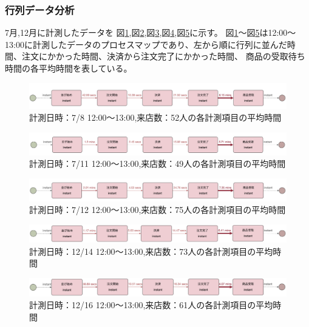 \documentclass{jsarticle}
\begin{document}
\subsubsection{行列データ分析}
7月,12月に計測したデータを
図\ref{fig:708},図\ref{fig:711},図\ref{fig:712},図\ref{fig:1214},図\ref{fig:1216}に示す。
図\ref{fig:708}〜図\ref{fig:1216}は12:00〜13:00に計測したデータのプロセスマップであり、左から順に行列に並んだ時間、注文にかかった時間、決済から注文完了にかかった時間、
商品の受取待ち時間の各平均時間を表している。

\begin{figure}[H]
  \centering
  \includegraphics[width=15cm]{708.png}
  \caption{計測日時：7/8 12:00〜13:00,来店数：52人の各計測項目の平均時間}
  \label{fig:708}
\end{figure}

\begin{figure}[H]
  \centering
  \includegraphics[width=15cm]{711.png}
  \caption{計測日時：7/11 12:00〜13:00,来店数：49人の各計測項目の平均時間}
  \label{fig:711}
\end{figure}

\begin{figure}[H]
  \centering
  \includegraphics[width=15cm]{712.png}
  \caption{計測日時：7/12 12:00〜13:00,来店数：75人の各計測項目の平均時間}
  \label{fig:712}
\end{figure}

\begin{figure}[H]
  \centering
  \includegraphics[width=15cm]{1214.png}
  \caption{計測日時：12/14 12:00〜13:00,来店数：73人の各計測項目の平均時間}
  \label{fig:1214}
\end{figure}

\begin{figure}[H]
  \centering
  \includegraphics[width=15cm]{1216.png}
  \caption{計測日時：12/16 12:00〜13:00,来店数：61人の各計測項目の平均時間}
  \label{fig:1216}
\end{figure}
\end{document}
